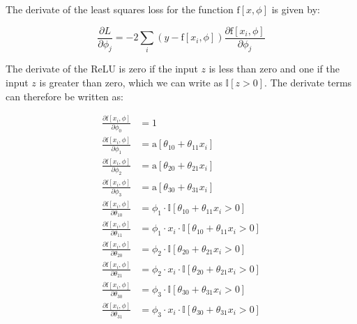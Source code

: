 \documentclass[12pt]{report}
\begin{document}
The derivate of the least squares loss for the function $\text{f}[x, \phi]$ is given by:

\begin{equation*}
    \frac{\partial L}{\partial \phi_{j}} = -2 \sum_{i}(y - \text{f}[x_{i}, \phi])\frac{\partial \text{f}[x_{i}, \phi]}{\partial \phi_{j}}
\end{equation*}

The derivate of the ReLU is zero if the input $z$ is less than zero and one if the input $z$ is greater than zero, which we can write as $\mathbb{I}[z > 0]$. The derivate terms can therefore be written as:

\begin{align*}
    \frac{\partial \text{f}[x_{i}, \phi]}{\partial \phi_{0}}    & = 1                                                                         \\
    \frac{\partial \text{f}[x_{i}, \phi]}{\partial \phi_{1}}    & = \text{a}[\theta_{10} + \theta_{11}x_{i}]                                  \\
    \frac{\partial \text{f}[x_{i}, \phi]}{\partial \phi_{2}}    & = \text{a}[\theta_{20} + \theta_{21}x_{i}]                                  \\
    \frac{\partial \text{f}[x_{i}, \phi]}{\partial \phi_{3}}    & = \text{a}[\theta_{30} + \theta_{31}x_{i}]                                  \\
    \frac{\partial \text{f}[x_{i}, \phi]}{\partial \theta_{10}} & = \phi_{1} \cdot \mathbb{I}[\theta_{10} + \theta_{11}x_{i} > 0]             \\
    \frac{\partial \text{f}[x_{i}, \phi]}{\partial \theta_{11}} & = \phi_{1} \cdot x_{i} \cdot \mathbb{I}[\theta_{10} + \theta_{11}x_{i} > 0] \\
    \frac{\partial \text{f}[x_{i}, \phi]}{\partial \theta_{20}} & = \phi_{2} \cdot \mathbb{I}[\theta_{20} + \theta_{21}x_{i} > 0]             \\
    \frac{\partial \text{f}[x_{i}, \phi]}{\partial \theta_{21}} & = \phi_{2} \cdot x_{i} \cdot \mathbb{I}[\theta_{20} + \theta_{21}x_{i} > 0] \\
    \frac{\partial \text{f}[x_{i}, \phi]}{\partial \theta_{30}} & = \phi_{3} \cdot \mathbb{I}[\theta_{30} + \theta_{31}x_{i} > 0]             \\
    \frac{\partial \text{f}[x_{i}, \phi]}{\partial \theta_{31}} & = \phi_{3} \cdot x_{i} \cdot \mathbb{I}[\theta_{30} + \theta_{31}x_{i} > 0]
\end{align*}
\end{document}
